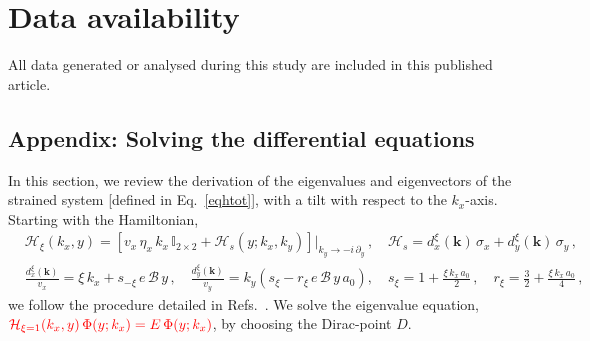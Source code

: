 \documentclass[aps,prb, onecolumn, nofootinbib, citeautoscript,10pt]{revtex4-2}
\newcommand{\red}[1]{{\color{red}#1}}
\newcommand{\bs}[1]{\boldsymbol{#1}}
\def \nn{\nonumber \\}
\begin{document}
\section*{Data availability}
All data generated or analysed during this study are included in this published article.






\appendix

\begin{widetext}
\section*{Appendix: Solving the differential equations}

In this section, we review the derivation of the eigenvalues and eigenvectors of the strained system [defined in Eq.~\eqref{eqhtot}], with a tilt with respect to the $k_x$-axis.
Starting with the Hamiltonian, 
\begin{align}
\label{eqhtotapp}
& \mathcal H_\xi (k_x, y) = \left[ 
 v_x \, \eta_x \, k_x \,  {\mathbb I}_{2\times 2}
 + \mathcal{H}_s(y; k_x, k_y) \right ]\big \vert_{k_y \rightarrow -i\, \partial_y}
\,, \quad 
\mathcal{H}_s  =   d^\xi_x (\bs k)\,\sigma_x +  d^\xi_y (\bs k)\,\sigma_y  \,, \nn &
\frac{ d^\xi_x(\boldsymbol{k}) } {v_x} = \xi \, k_x + s_{-\xi} \, e \, {\mathcal B} \, y\,,
\quad
\frac {d^\xi_y(\boldsymbol{k})} {v_y} =  k_y  \left(s_\xi - r_\xi \, e \, {\mathcal B} \, y\, a_0
\right )  ,
\quad s_\xi = 1 + \frac{\xi \, k_x\, a_0 } {2}\,, \quad
r_\xi = \frac{3}{2} + \frac{\xi \, k_x\, a_0 } {4} \,,
\end{align}
we follow the procedure detailed in Refs.~\cite{strained-dirac-franz, complex-LL-strained-graphene}. We solve the eigenvalue equation, $\red{\mathcal H_{\xi=1} (k_x, y)\,\Phi (y; k_x) = E\, \Phi (y; k_x)}$, by choosing the Dirac-point $D$. 



\end{widetext}
\end{document}
